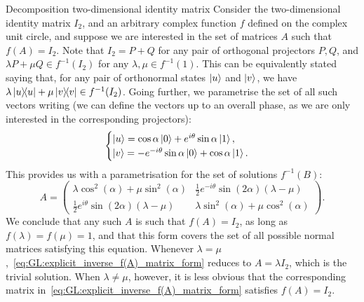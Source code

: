 \begin{examplebox}[label={ex:GL:solutions_f(A)=I2}]{Decomposition two-dimensional identity matrix}
Consider the two-dimensional identity matrix $I_2$, and an arbitrary complex function $f$ defined on the complex unit circle, and suppose we are interested in the set of matrices $A$ such that $f(A)=I_2$.
Note that $I_2=P+Q$ for any pair of orthogonal projectors $P,Q$, and $\lambda P + \mu Q\in f^{-1}(I_2)$ for any $\lambda,\mu\in f^{-1}(1)$.
This can be equivalently stated saying that, for any pair of orthonormal states $\ket u$ and $\ket v$, we have
$\lambda \ketbra u + \mu \ketbra v\in f^{-1}(I_2)$.
Going further, we parametrise the set of all such vectors writing (we can define the vectors up to an overall phase, as we are only interested in the corresponding projectors):
\begin{equation}
    \begin{cases}
    \ket u =\cos\alpha\ket 0+e^{i\theta}\sin\alpha \ket 1, \\
    \ket v =-e^{-i\theta}\sin\alpha\ket 0 + \cos\alpha\ket 1.
\end{cases}
\end{equation}
This provides us with a parametrisation for the set of solutions $f^{-1}(B)$:
\begin{equation}
    A = \begin{pmatrix}
        \lambda \cos^2(\alpha)+\mu\sin^2(\alpha) &
        \frac12 e^{-i\theta} \sin(2\alpha) (\lambda-\mu) \\ 
        \frac12 e^{i\theta} \sin(2\alpha) (\lambda-\mu) &
        \lambda \sin^2(\alpha)+\mu\cos^2(\alpha)
    \end{pmatrix}.
    \label{eq:GL:explicit_inverse_f(A)_matrix_form}
\end{equation}
We conclude that any such $A$ is such that $f(A)=I_2$, as long as $f(\lambda)=f(\mu)=1$, and that this form covers the set of all possible normal matrices satisfying this equation.
Whenever $\lambda=\mu$,~\cref{eq:GL:explicit_inverse_f(A)_matrix_form} reduces to $A=\lambda I_2$, which is the trivial solution. When $\lambda\neq\mu$, however, it is less obvious that the corresponding matrix in~\cref{eq:GL:explicit_inverse_f(A)_matrix_form} satisfies $f(A)=I_2$.

\end{examplebox}
